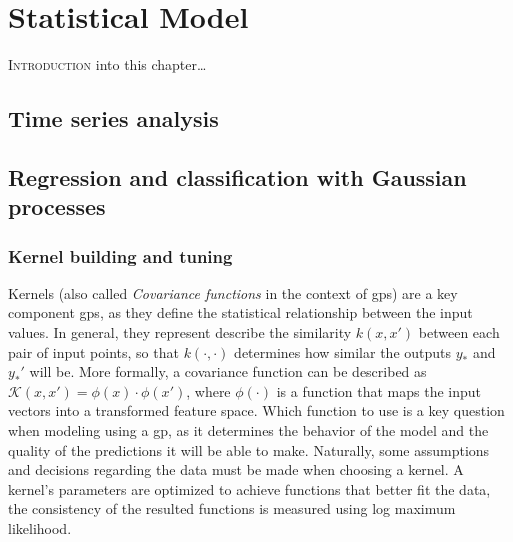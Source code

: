 \chapter{Statistical Model}
\label{chap:statistical_model}

\lettrine{I}{ntroduction} into this chapter\dots

\pagebreak

\section{Time series analysis}
\label{sec:time_series_analysis}

\section{Regression and classification with Gaussian processes}
\label{sec:gaussian_processes}


\subsection{Kernel building and tuning}
\label{subsec:covariance_functions}


Kernels (also called \textit{Covariance functions} in the context of \acp{gp}) are a key component \acp{gp}, as they define the statistical relationship between the input values.
In general, they represent describe the similarity $k(x, x')$ between each pair of input points, so that $k(\cdot, \cdot)$ determines how similar the outputs $y_*$ and $y_*'$ will be. 
More formally, a covariance function can be described as $\mathcal{K}(x, x') = \phi(x) \cdot \phi(x')$, where $\phi(\cdot)$ is a function that maps the input vectors into a transformed feature space.
Which function to use is a key question when modeling using a \ac{gp}, as it determines the behavior of the model and the quality of the predictions it will be able to make.
Naturally, some assumptions and decisions regarding the data must be made when choosing a kernel.
A kernel's parameters are optimized to achieve functions that better fit the data, the consistency of the resulted functions is measured using log maximum likelihood.

